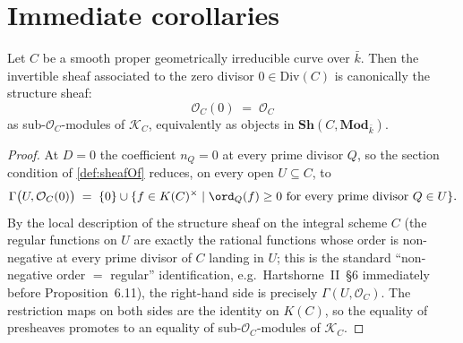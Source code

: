 \section{Immediate corollaries}

\begin{lemma}
  \label{lem:sheafOf_zero}

  Let \(C\) be a smooth proper geometrically irreducible curve over
  \(\bar k\). Then the invertible sheaf associated to the zero divisor
  \(0 \in \mathrm{Div}(C)\) is canonically the structure sheaf:
  \[
    \mathcal O_C(0) \;=\; \mathcal O_C
  \]
  as sub-\(\mathcal O_C\)-modules of \(\mathcal K_C\), equivalently as
  objects in \(\mathbf{Sh}(C, \mathbf{Mod}_{\bar k})\).
\end{lemma}

\begin{proof}
  
  
\leanok
  At \(D = 0\) the coefficient \(n_Q = 0\) at every prime divisor \(Q\), so the
  section condition of \cref{def:sheafOf} reduces, on every open
  \(U \subseteq C\), to
  \[
    \Gamma\bigl(U, \mathcal O_C(0)\bigr)
    \;=\; \{ 0 \} \cup \{ f \in K(C)^{\times} \;|\;
      \ord_Q(f) \geq 0 \text{ for every prime divisor } Q \in U \}.
  \]
  By the local description of the structure sheaf on the integral
  scheme \(C\) (the regular functions on \(U\) are exactly the rational
  functions whose order is non-negative at every prime divisor of
  \(C\) landing in \(U\); this is the standard ``non-negative order \(=\)
  regular'' identification, e.g.\ Hartshorne~II~\S6 immediately before
  Proposition~6.11), the right-hand side is precisely
  \(\Gamma(U, \mathcal O_C)\). The restriction maps on both sides are
  the identity on \(K(C)\), so the equality of presheaves promotes to an
  equality of sub-\(\mathcal O_C\)-modules of \(\mathcal K_C\).
\end{proof}

